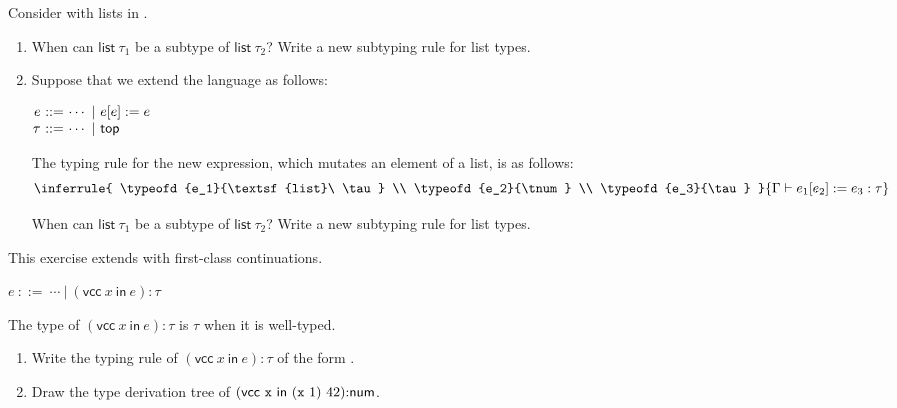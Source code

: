 \begin{exercise}

Consider \plang with lists in .
  \begin{enumerate}
    \item When can $\textsf{list}\ \tau_1$ be a subtype of $\textsf{list}\
      \tau_2$? Write a new subtyping rule for list types.
    \item Suppose that we extend the language as follows:

      \vspace{0.5em}
      $\begin{array}{@{}r@{~}r@{~}l@{}}
        e & ::= & \cdots\ |\ e[e]:=e \\
        \tau & ::= & \cdots\ |\ \ttop \\
      \end{array}$
      \vspace{0.5em}

      The typing rule for the new expression, which mutates an element of a
      list, is as follows:
      \[
        \inferrule
        { \typeofd{e_1}{\textsf{list}\ \tau} \\
          \typeofd{e_2}{\tnum} \\
          \typeofd{e_3}{\tau}
        }
        { \typeofd{e_1[e_2]:=e_3}{\tau} }
      \]

      When can $\textsf{list}\ \tau_1$ be a subtype of $\textsf{list}\
      \tau_2$? Write a new subtyping rule for list types.
  \end{enumerate}

\end{exercise}

\begin{exercise}

This exercise extends \lang with first-class continuations.

    \vspace{0.5em}
    $e\ ::=\ \cdots\ |\ (\textsf{vcc}\ x\ \textsf{in}\ e){:}\tau$
    \vspace{0.5em}

    The type of
    $(\textsf{vcc}\ x\ \textsf{in}\ e){:}\tau$ is $\tau$ when it is well-typed.

\begin{enumerate}
  \item
    Write the typing rule of $(\textsf{vcc}\ x\ \textsf{in}\ e){:}\tau$
    of the form .
  \item Draw the type derivation tree of
    $(\textsf{vcc}\ {\code{x}}\ \textsf{in}\ {\eapp{(\eapp{\code{x}}{1})}{42}}){:}\tnum$.
\end{enumerate}

\end{exercise}

